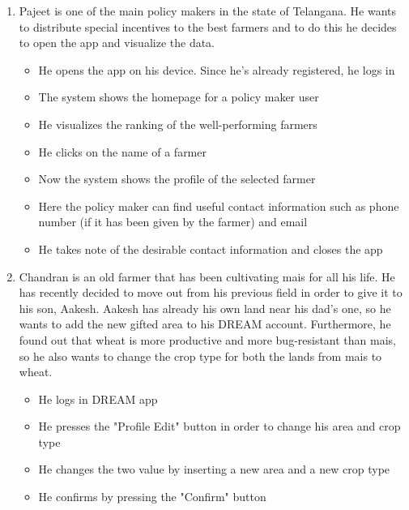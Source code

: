\documentclass[table, 12pt]{article}
\begin{document}
\begin{enumerate}
    \item Pajeet is one of the main policy makers in the state of Telangana.
    He wants to distribute special incentives to the best farmers and to do this he decides
    to open the app and visualize the data.
    \begin{itemize}
        \item He opens the app on his device. Since he's already registered, he logs in
        \item The system shows the homepage for a policy maker user
        \item He visualizes the ranking of the well-performing farmers
        \item He clicks on the name of a farmer
        \item Now the system shows the profile of the selected farmer
        \item Here the policy maker can find useful contact information such as phone number (if it has been given by the farmer) and email
        \item He takes note of the desirable contact information and closes the app
    \end{itemize}

    \item Chandran is an old farmer that has been cultivating mais for all his life. He has recently decided to move out from his previous field in order to give it to his son, Aakesh. Aakesh has already his own land near his dad's one, so he wants to add the new gifted area to his DREAM account. Furthermore, he found out that wheat is more productive and more bug-resistant than mais, so he also wants to change the crop type for both the lands from mais to wheat.
    \begin{itemize}
        \item He logs in DREAM app
        \item He presses the "Profile Edit" button in order to change his area and crop type
        \item He changes the two value by inserting a new area and a new crop type
        \item He confirms by pressing the "Confirm" button
    \end{itemize}


\end{enumerate}
\end{document}

